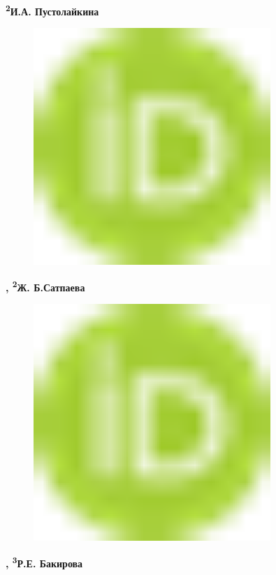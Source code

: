 {\bfseries \textsuperscript{2}И.А.
Пустолайкина}
\begin{figure}[H]
	\centering
	\includegraphics[width=0.8\textwidth]{media/chem2/image1}
	\caption*{}
\end{figure}
{\bfseries ,
\textsuperscript{2}Ж.
Б.Сатпаева}
\begin{figure}[H]
	\centering
	\includegraphics[width=0.8\textwidth]{media/chem2/image1}
	\caption*{}
\end{figure}
{\bfseries ,
\textsuperscript{3}Р.Е.
Бакирова}
